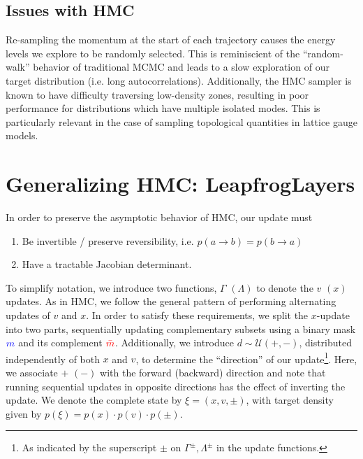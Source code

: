 \documentclass[a4paper,11pt]{article}
\newcommand{\mask}{\textcolor{blue}{{m}}}
\newcommand{\maskbar}{\textcolor{red}{\bar{m}}}
\begin{document}
\subsection{\label{subsec:hmc_issues}Issues with HMC}
%
Re-sampling the momentum at the start of each trajectory causes the energy
levels we explore to be randomly selected.
%
This is reminiscient of the ``random-walk'' behavior of traditional MCMC and
leads to a slow exploration of our target distribution (i.e. long
autocorrelations).
%
Additionally, the HMC sampler is known to have difficulty traversing
low-density zones, resulting in poor performance for distributions which have
multiple isolated modes.
%
This is particularly relevant in the case of sampling topological quantities in
lattice gauge models.
%
%
%
\section{\label{sec:l2hmc}Generalizing HMC: LeapfrogLayers}
%
In order to preserve the asymptotic behavior of HMC, our update must
%
\begin{enumerate}
    \item Be invertible / preserve reversibility, i.e. \(p(a\rightarrow b) =
        p(b\rightarrow a)\)
    \item Have a tractable Jacobian determinant.
\end{enumerate}
%
To simplify notation, we introduce two functions, \(\Gamma\) \((\Lambda)\) to
denote the \(v\) \((x)\) updates.
%
As in HMC, we follow the general pattern of performing alternating updates of
\(v\) and \(x\).
%
In order to satisfy these requirements, we split the \(x\)-update
into two parts, sequentially updating complementary subsets using a binary mask
\(\mask\) and its complement \(\maskbar\).
%
Additionally, we introduce \(d \sim \mathcal{U} (+, -)\), distributed
independently of both \(x\) and \(v\), to determine the ``direction'' of our
update\footnote{%
  As indicated by the superscript \(\pm\) on \(\Gamma^{\pm}, \Lambda^{\pm}\) in
  the update functions.
}.
%
Here, we associate \(+\) \((-)\) with the forward (backward) direction and note
that running sequential updates in opposite directions has the effect of
inverting the update.
%
We denote the complete state by \(\xi = (x, v, \pm)\), with target density
given by \(p(\xi) = p(x)\cdot p(v)\cdot p(\pm)\).
%
\end{document}
